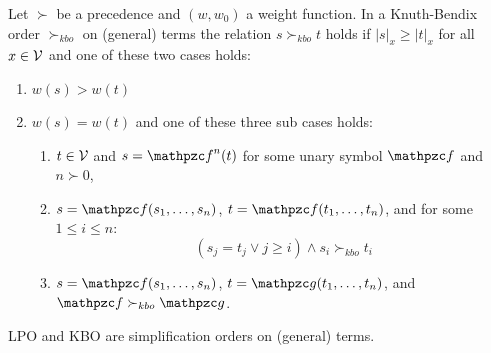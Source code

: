\begin{definition}[KBO]\label{def:kbo}
	Let $\succ$ be a precedence and $(w,w_0)$ a weight function.
	In a Knuth-Bendix order $\succ_{kbo}$ on (general) terms the relation $s\succ_{kbo} t$ holds if
	$|s|_x\geq|t|_x$ for all $x\in{\mathcal V}$ and one of these two cases holds:
	\begin{enumerate}
		\item $w(s) > w(t)$
		\item $w(s) = w(t)$ and one of these three sub cases holds:
		\begin{enumerate}
			\item $t\in{\mathcal V}$ and $s=\mcf^n(t)$ for some unary symbol $\mcf$ and $n\succ0$,
			\item $s=\mcf(s_1,\ldots,s_n)$, $t=\mcf(t_1,\ldots,t_n)$, and for some $1\leq i\leq n$:
			\[
			(s_j=t_j \lor j\geq i) \land s_i\succ_{kbo} t_i
			\]
			\item $s=\mcf(s_1,\ldots,s_n)$, $t=\mcg(t_1,\ldots,t_n)$, and $\mcf\succ_{kbo}\mcg$.
		\end{enumerate}
	\end{enumerate}
\end{definition}

\begin{lemma}
	LPO and KBO are simplification orders on (general) terms.
\end{lemma}

